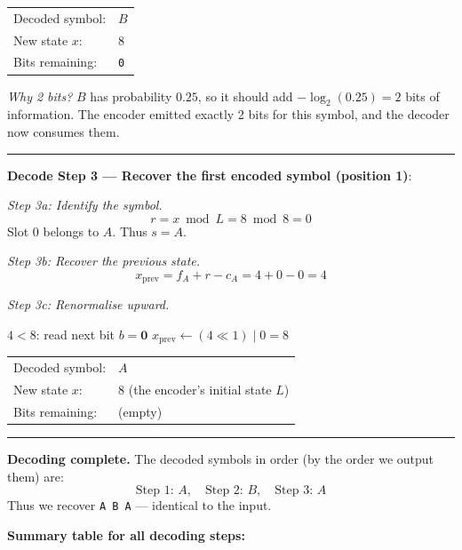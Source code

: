 \begin{examplebox}
\begin{center}
\begin{tabular}{@{}ll@{}}
  Decoded symbol: & $B$ \\
  New state $x$:  & $8$ \\
  Bits remaining: & \texttt{0} \\
\end{tabular}
\end{center}

\noindent\textit{Why 2 bits?}  $B$ has probability $0.25$,
so it should add $-\log_2(0.25)=2$ bits of information.
The encoder emitted exactly 2 bits for this symbol, and the
decoder now consumes them.

\medskip\hrule\medskip

\noindent\textbf{Decode Step 3 — Recover the first encoded symbol (position 1)}:

\medskip
\noindent\emph{Step 3a: Identify the symbol.}
\[
r = x \bmod L = 8 \bmod 8 = 0
\]
Slot $0$ belongs to $A$.  Thus $s = A$.

\medskip
\noindent\emph{Step 3b: Recover the previous state.}
\[
x_{\text{prev}} = f_A + r - c_A = 4 + 0 - 0 = 4
\]

\noindent\emph{Step 3c: Renormalise upward.}

\begin{algorithmic}[1]
    \State $4 < 8$: read next bit $b = \mathbf{0}$
    \State $x_{\text{prev}} \leftarrow (4 \ll 1) \mid 0 = 8$
\EndWhile
{}
\end{algorithmic}

\begin{center}
\begin{tabular}{@{}ll@{}}
  Decoded symbol: & $A$ \\
  New state $x$:  & $8$ (the encoder's initial state $L$) \\
  Bits remaining: & (empty) \\
\end{tabular}
\end{center}

\medskip\hrule\medskip

\noindent\textbf{Decoding complete.}  The decoded symbols in order
(by the order we output them) are:
\[
\text{Step 1: } A,\quad \text{Step 2: } B,\quad \text{Step 3: } A
\]
Thus we recover \texttt{A B A} — identical to the input. \checkmark

\medskip
\noindent\textbf{Summary table for all decoding steps:}


\end{examplebox}
